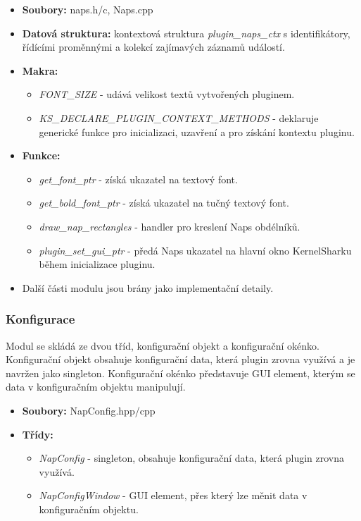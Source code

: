 \begin{itemize}
  \item \textbf{Soubory:} naps.h/c, Naps.cpp
  \item \textbf{Datová struktura:} kontextová struktura \emph{plugin\_naps\_ctx} s identifikátory, řídícími proměnnými a kolekcí zajímavých záznamů událostí.
  \item \textbf{Makra:}
  \begin{itemize}
    \item \emph{FONT\_SIZE} - udává velikost textů vytvořených pluginem.
    \item \emph{KS\_DECLARE\_PLUGIN\_CONTEXT\_METHODS} - deklaruje generické funkce pro inicializaci, uzavření a pro získání kontextu pluginu.
  \end{itemize}
  \item \textbf{Funkce:}
  \begin{itemize}
    \item \emph{get\_font\_ptr} - získá ukazatel na textový font.
    \item \emph{get\_bold\_font\_ptr} - získá ukazatel na tučný textový font.
    \item \emph{draw\_nap\_rectangles} - handler pro kreslení Naps obdélníků.
    \item \emph{plugin\_set\_gui\_ptr} - předá Naps ukazatel na hlavní okno KernelSharku během inicializace pluginu.
  \end{itemize}
  \item Další části modulu jsou brány jako implementační detaily.
\end{itemize}

\subsubsection*{Konfigurace}
Modul se skládá ze dvou tříd, konfigurační objekt a konfigurační okénko. Konfigurační objekt obsahuje konfigurační data, která plugin zrovna využívá a je navržen jako singleton. Konfigurační okénko představuje GUI element, kterým se data v konfiguračním objektu manipulují.

\begin{itemize}
    \item \textbf{Soubory:} NapConfig.hpp/cpp
    \item \textbf{Třídy:}
    \begin{itemize}
      \item \emph{NapConfig} - singleton, obsahuje konfigurační data, která plugin zrovna využívá.
      \item \emph{NapConfigWindow} - GUI element, přes který lze měnit data v konfiguračním objektu.
    \end{itemize}
\end{itemize}

